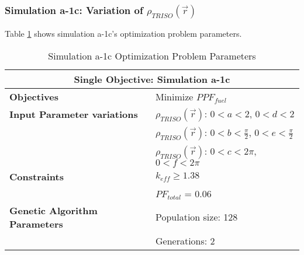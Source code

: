 \subsubsection{Simulation a-1c: Variation of $\rho_{TRISO}(\vec{r})$}
Table \ref{tab:simulationa1c} shows simulation a-1c's optimization problem parameters. 
\begin{table}[htbp!]
    \centering
    \onehalfspacing
    \caption{Simulation a-1c Optimization Problem Parameters}
	\label{tab:simulationa1c}
    \footnotesize
    \begin{tabular}{l|p{5.3cm}}
    \hline 
    \multicolumn{2}{c}{\textbf{Single Objective: Simulation a-1c}} \\
    \hline 
    \textbf{Objectives} & Minimize $PPF_{fuel}$ \\
    \hline 
    \textbf{Input Parameter variations}
    & $\rho_{TRISO}(\vec{r})$: $0<a<2$, $0<d<2$\\
    & $\rho_{TRISO}(\vec{r})$: $0<b<\frac{\pi}{2}$, $0<e<\frac{\pi}{2}$\\
    & $\rho_{TRISO}(\vec{r})$: $0<c<2\pi$, $0<f<2\pi$\\
    \hline
    \textbf{Constraints} & $k_{eff} \geq 1.38$\\ 
    & $PF_{total}$ = 0.06 \\
    \hline 
    \textbf{Genetic Algorithm Parameters} & Population size: 128 \\
    & Generations: 2 \\
    \hline
    \end{tabular}
\end{table}

